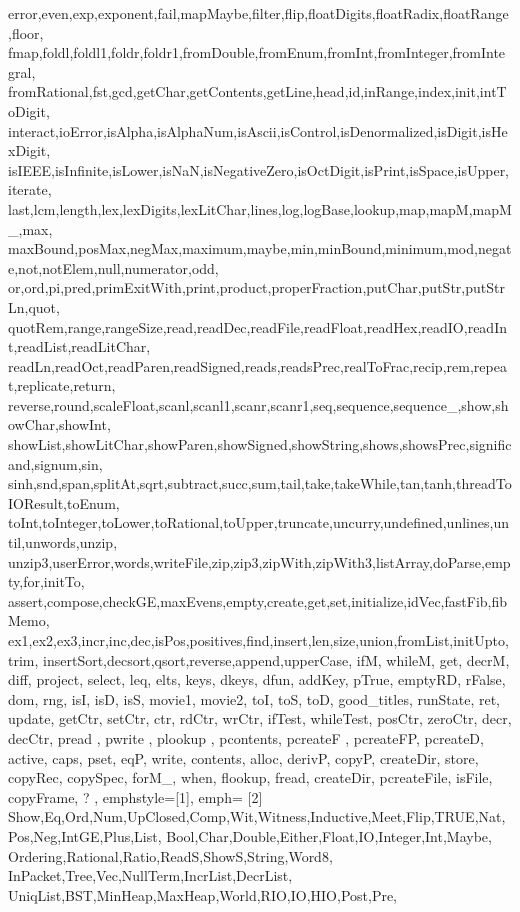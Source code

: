 {{		error,even,exp,exponent,fail,mapMaybe,filter,flip,floatDigits,floatRadix,floatRange,floor,
		fmap,foldl,foldl1,foldr,foldr1,fromDouble,fromEnum,fromInt,fromInteger,fromIntegral,
		fromRational,fst,gcd,getChar,getContents,getLine,head,id,inRange,index,init,intToDigit,
		interact,ioError,isAlpha,isAlphaNum,isAscii,isControl,isDenormalized,isDigit,isHexDigit,
		isIEEE,isInfinite,isLower,isNaN,isNegativeZero,isOctDigit,isPrint,isSpace,isUpper,iterate,
		last,lcm,length,lex,lexDigits,lexLitChar,lines,log,logBase,lookup,map,mapM,mapM_,max,
		maxBound,posMax,negMax,maximum,maybe,min,minBound,minimum,mod,negate,not,notElem,null,numerator,odd,
		or,ord,pi,pred,primExitWith,print,product,properFraction,putChar,putStr,putStrLn,quot,
		quotRem,range,rangeSize,read,readDec,readFile,readFloat,readHex,readIO,readInt,readList,readLitChar,
		readLn,readOct,readParen,readSigned,reads,readsPrec,realToFrac,recip,rem,repeat,replicate,return,
		reverse,round,scaleFloat,scanl,scanl1,scanr,scanr1,seq,sequence,sequence_,show,showChar,showInt,
		showList,showLitChar,showParen,showSigned,showString,shows,showsPrec,significand,signum,sin,
		sinh,snd,span,splitAt,sqrt,subtract,succ,sum,tail,take,takeWhile,tan,tanh,threadToIOResult,toEnum,
		toInt,toInteger,toLower,toRational,toUpper,truncate,uncurry,undefined,unlines,until,unwords,unzip,
		unzip3,userError,words,writeFile,zip,zip3,zipWith,zipWith3,listArray,doParse,empty,for,initTo,
        assert,compose,checkGE,maxEvens,empty,create,get,set,initialize,idVec,fastFib,fibMemo,
        ex1,ex2,ex3,incr,inc,dec,isPos,positives,find,insert,len,size,union,fromList,initUpto,trim,
        insertSort,decsort,qsort,reverse,append,upperCase, ifM, whileM, get, decrM, diff,
        project, select, leq, elts, keys, dkeys, dfun, addKey, pTrue, emptyRD, rFalse,
        	dom, rng, isI, isD, isS, movie1, movie2,  toI, toS, toD, good_titles, runState, ret,
        	update, getCtr, setCtr, ctr, rdCtr, wrCtr, ifTest, whileTest, posCtr, zeroCtr, decr, decCtr,
        	pread , pwrite , plookup , pcontents, pcreateF , pcreateFP, pcreateD, active, caps, pset, eqP,
        	write, contents, alloc, derivP, copyP, createDir, store, copyRec, copySpec,
        	forM_, when, flookup, fread, createDir, pcreateFile, isFile, copyFrame, ?
	},
	emphstyle={[1]\color{haskellblue}},
	emph=
	{[2] 	Show,Eq,Ord,Num,UpClosed,Comp,Wit,Witness,Inductive,Meet,Flip,TRUE,Nat,Pos,Neg,IntGE,Plus,List,
        Bool,Char,Double,Either,Float,IO,Integer,Int,Maybe,
        Ordering,Rational,Ratio,ReadS,ShowS,String,Word8,
        InPacket,Tree,Vec,NullTerm,IncrList,DecrList,
        UniqList,BST,MinHeap,MaxHeap,World,RIO,IO,HIO,Post,Pre,
}}
